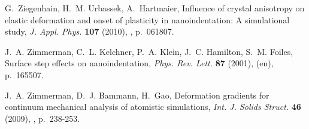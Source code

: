 \documentclass[CRPHYS,Unicode,manuscript]{cedram}
\begin{document}
\begin{thebibliography}{100}
G.~Ziegenhain, H.~M. Urbassek, A.~Hartmaier, {\og Influence of crystal
  anisotropy on elastic deformation and onset of plasticity in nanoindentation:
  A simulational study\fg}, \emph{J. Appl. Phys.} \textbf{107} (2010),
  , p.~061807.

J.~A. Zimmerman, C.~L. Kelchner, P.~A. Klein, J.~C. Hamilton, S.~M. Foiles,
  {\og Surface step effects on nanoindentation\fg}, \emph{Phys. Rev. Lett.}
  \textbf{87} (2001),  (en), p.~165507.

J.~A. Zimmerman, D.~J. Bammann, H.~Gao, {\og Deformation gradients for
  continuum mechanical analysis of atomistic simulations\fg}, \emph{Int. J.
  Solids Struct.} \textbf{46} (2009), , p.~238-253.

\end{thebibliography}
\end{document}

